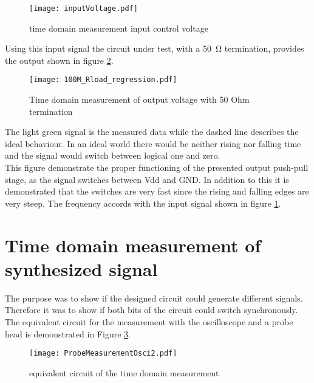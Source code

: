\begin{figure}[htb!]
	\centering
  \texttt{[image: inputVoltage.pdf]}
	\caption{time domain measurement input control voltage}
	\label{fig:inputMeas}
\end{figure}


Using this input signal the circuit under test, with a \SI{50}{\ohm} termination, provides the output shown in figure \ref{fig:measRload100M}.


\begin{figure}[htb!]
	\centering
  \texttt{[image: 100M\_Rload\_regression.pdf]}
	\caption{Time domain measurement of output voltage with 50 Ohm termination}
	\label{fig:measRload100M}
\end{figure}

The light green signal is the measured data while the dashed line describes the ideal behaviour.
In an ideal world there would be neither rising nor falling time and the signal would switch between logical one and zero.\\
This figure demonstrate the proper functioning of the presented output push-pull stage, as the signal switches between Vdd and GND.
In addition to this it is demonstrated that the switches are very fast since the rising and falling edges are very steep.
The frequency accords with the input signal shown in figure \ref{fig:inputMeas}.


\section{Time domain measurement of synthesized signal}
\label{ch:timedomainmeas}
The purpose was to show if the designed circuit could generate different signals.
Therefore it was to show if both bits of the circuit could switch synchronously.
The equivalent circuit for the measurement with the oscilloscope and a probe head is demonstrated in Figure \ref{fig:equivalentprobecircuit}.
\begin{figure}[htb!]
	\centering
  \texttt{[image: ProbeMeasurementOsci2.pdf]}
	\caption{equivalent circuit of the time domain measurement}
	\label{fig:equivalentprobecircuit}
\end{figure}

